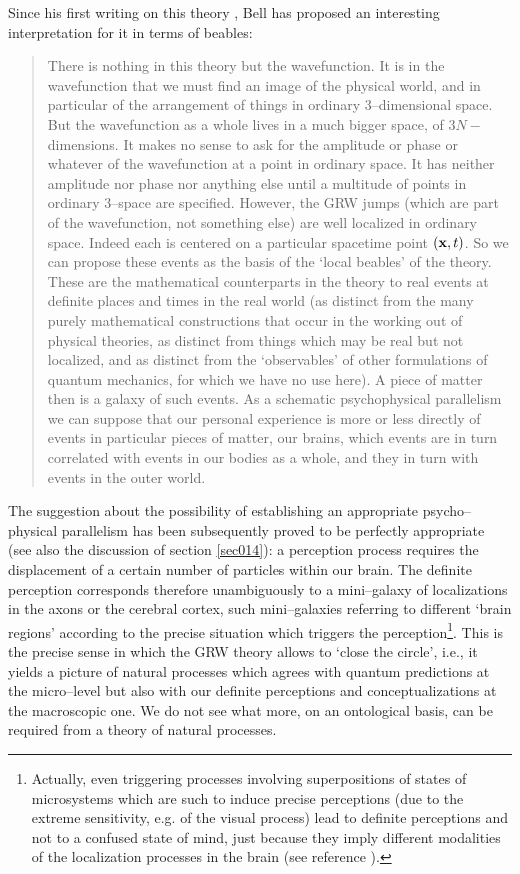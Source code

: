 \documentclass[10pt,a4paper]{article}
\begin{document}
Since his first writing on this theory \cite{bells}, Bell has
proposed an interesting interpretation for it in terms of beables:
\begin{quotation}
There is nothing in this theory but the wavefunction. It is in the
wavefunction that we must find an image of the physical world, and
in particular of the arrangement of things in ordinary
3--dimensional space. But the wavefunction as a whole lives in a
much bigger space, of $3N-$dimensions. It makes no sense to ask
for the amplitude or phase or whatever of the wavefunction at a
point in ordinary space. It has neither amplitude nor phase nor
anything else until a multitude of points in ordinary 3--space are
specified. However, the GRW jumps (which are part of the
wavefunction, not something else) are well localized in ordinary
space. Indeed each is centered on a particular spacetime point
$({\bf x},t)$. So we can propose these events as the basis of the
`local beables' of the theory. These are the mathematical
counterparts in the theory to real events at definite places and
times in the real world (as distinct from the many purely
mathematical constructions that occur in the working out of
physical theories, as distinct from things which may be real but
not localized, and as distinct from the `observables' of other
formulations of quantum mechanics, for which we have no use here).
A piece of matter then is a galaxy of such events. As a schematic
psychophysical parallelism we can suppose that our personal
experience is more or less directly of events in particular pieces
of matter, our brains, which events are in turn correlated with
events in our bodies as a whole, and they in turn with events in
the outer world.
\end{quotation}

The suggestion about the possibility of establishing
an appropriate psycho--physical parallelism has been subsequently
proved  \cite{abp}  to be perfectly appropriate (see also the discussion of
section
\ref{sec014}): a perception process
requires the displacement of a certain number of particles within
our brain. The definite perception corresponds therefore
unambiguously to a mini--galaxy of localizations in the axons or
the cerebral cortex, such mini--galaxies referring to different
`brain regions' according to the precise situation which triggers the
perception\footnote{Actually, even triggering processes involving
superpositions of states of microsystems which are such to induce
precise perceptions (due to the extreme sensitivity, e.g. of the
visual process) lead to definite perceptions and not to a confused
state of mind, just because they imply different modalities of the
localization processes in the brain (see reference \cite{abp}).}.
This is the precise sense in which the GRW theory allows  to
`close the circle', i.e., it yields a picture of natural processes
which agrees with quantum predictions at the micro--level but also
with our definite perceptions and conceptualizations at the
macroscopic one. We do not see what more, on an ontological basis,
can be required from a theory of natural processes.
\end{document}
